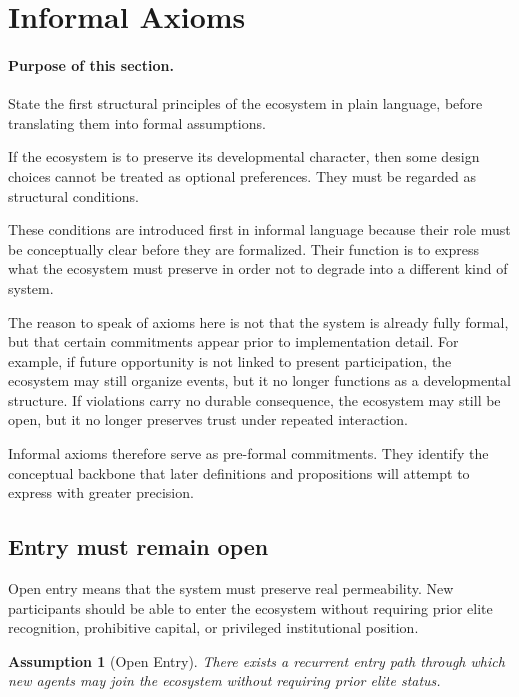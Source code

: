 \documentclass[11pt]{article}
\newtheorem{assumption}{Assumption}
\begin{document}
\section{Informal Axioms}

\paragraph{Purpose of this section.}
State the first structural principles of the ecosystem in plain language, before translating them into formal assumptions.

If the ecosystem is to preserve its developmental character, then some design choices cannot be treated as optional preferences. They must be regarded as structural conditions.

These conditions are introduced first in informal language because their role must be conceptually clear before they are formalized. Their function is to express what the ecosystem must preserve in order not to degrade into a different kind of system.

The reason to speak of axioms here is not that the system is already fully formal, but that certain commitments appear prior to implementation detail. For example, if future opportunity is not linked to present participation, the ecosystem may still organize events, but it no longer functions as a developmental structure. If violations carry no durable consequence, the ecosystem may still be open, but it no longer preserves trust under repeated interaction.

Informal axioms therefore serve as pre-formal commitments. They identify the conceptual backbone that later definitions and propositions will attempt to express with greater precision.

\subsection{Entry must remain open}

Open entry means that the system must preserve real permeability. New participants should be able to enter the ecosystem without requiring prior elite recognition, prohibitive capital, or privileged institutional position.

\begin{assumption}[Open Entry]
There exists a recurrent entry path through which new agents may join the ecosystem without requiring prior elite status.
\end{assumption}
\end{document}
